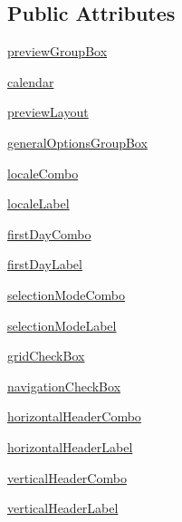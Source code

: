 \subsection*{Public Attributes}
\begin{DoxyCompactItemize}
\item 
\hyperlink{classcalendarwidget_1_1Window_a0ddb5966159f9f71aaeeb465a85349c5}{preview\+Group\+Box}
\item 
\hyperlink{classcalendarwidget_1_1Window_a18fc3b71452f9f18bb42da53aaa6720c}{calendar}
\item 
\hyperlink{classcalendarwidget_1_1Window_af5443c06f66490868b73152e21e975ae}{preview\+Layout}
\item 
\hyperlink{classcalendarwidget_1_1Window_a0ab3b13b14aae1cf9fccbf0086d3d245}{general\+Options\+Group\+Box}
\item 
\hyperlink{classcalendarwidget_1_1Window_ae0e0eaf3d56b0fb7ac425bd9c1138f24}{locale\+Combo}
\item 
\hyperlink{classcalendarwidget_1_1Window_a443e79b53b86101b224aa6463f21383f}{locale\+Label}
\item 
\hyperlink{classcalendarwidget_1_1Window_a602807dcfdc42f723c8e6444979ca661}{first\+Day\+Combo}
\item 
\hyperlink{classcalendarwidget_1_1Window_ad84dfdb1d4e29a833e43950be0f6d133}{first\+Day\+Label}
\item 
\hyperlink{classcalendarwidget_1_1Window_a16b00ae8ccc39581ca04c5abfd07db09}{selection\+Mode\+Combo}
\item 
\hyperlink{classcalendarwidget_1_1Window_a871d904e432bc5d5dd6eda31e9107261}{selection\+Mode\+Label}
\item 
\hyperlink{classcalendarwidget_1_1Window_a246a5f3156efeeeac4c5d0dd7f53732c}{grid\+Check\+Box}
\item 
\hyperlink{classcalendarwidget_1_1Window_a91c3c2691ef98f2740f53b1eca80189f}{navigation\+Check\+Box}
\item 
\hyperlink{classcalendarwidget_1_1Window_a13333d6485b94e4db8da0165b2c97846}{horizontal\+Header\+Combo}
\item 
\hyperlink{classcalendarwidget_1_1Window_a52e63854900628c7c10582a80a3cd5a2}{horizontal\+Header\+Label}
\item 
\hyperlink{classcalendarwidget_1_1Window_a3a3b4bde996f1ef2b807220224d551ac}{vertical\+Header\+Combo}
\item 
\hyperlink{classcalendarwidget_1_1Window_ab8ac4f0ec123b9516a90856fb80143ba}{vertical\+Header\+Label}
\item 

\end{DoxyCompactItemize}
